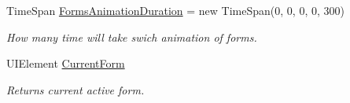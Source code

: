 \begin{DoxyCompactItemize}
Time\+Span \mbox{\hyperlink{class_wpf_handler_1_1_u_i_1_1_controls_1_1_logon_1_1_logon_screen_a66c8e6dd59e6951a2ccf9889daaadde6}{Forms\+Animation\+Duration}} = new Time\+Span(0, 0, 0, 0, 300)
\begin{DoxyCompactList}\small\item\em How many time will take swich animation of forms. \end{DoxyCompactList}\item 
U\+I\+Element \mbox{\hyperlink{class_wpf_handler_1_1_u_i_1_1_controls_1_1_logon_1_1_logon_screen_a7e4c55e305734514eeedf6b387dad3ea}{Current\+Form}}
\begin{DoxyCompactList}\small\item\em Returns current active form. \end{DoxyCompactList}\end{DoxyCompactItemize}
